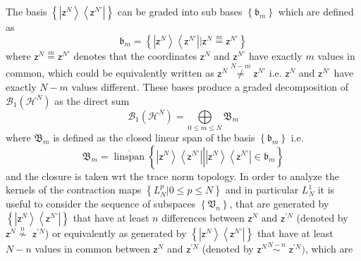 \documentclass[aps,preprint]{revtex4}%
\begin{document}
The basis $\left\{  \left\vert \mathsf{z}^{N}\right\rangle \left\langle
\mathsf{z}^{N\prime}\right\vert \right\}  $ can be graded into sub bases
$\left\{  \mathfrak{b}_{m}\right\}  $ which are defined as
\begin{equation}
\mathfrak{b}_{m}=\left\{  \left\vert \mathsf{z}^{N}\right\rangle \left\langle
\mathsf{z}^{N\prime}\right\vert |\mathsf{z}^{N}\overset{m}{=}\mathsf{z}%
^{N\prime}\right\}
\end{equation}
where $\mathsf{z}^{N}\overset{m}{=}\mathsf{z}^{N\prime}$ denotes that the
coordinates $\mathsf{z}^{N}$ and $\mathsf{z}^{N\prime}$ have exactly $m$
values in common, which could be equivalently written as $\mathsf{z}%
^{N}\overset{N-m}{\neq}\mathsf{z}^{N\prime}$ i.e. $\mathsf{z}^{N}$ and
$\mathsf{z}^{N\prime}$ have exactly $N-m$ values different. These bases
produce a graded decomposition of $\mathcal{B}_{1}\left(  \mathcal{H}%
^{N}\right)  $ as the direct sum
\begin{equation}
\mathcal{B}_{1}\left(  \mathcal{H}^{N}\right)  =%
{\displaystyle\bigoplus\limits_{0\leq m\leq N}}
\mathfrak{B}_{m}%
\end{equation}
where $\mathfrak{B}_{m}$ is defined as the closed linear span of the basis
$\left\{  \mathfrak{b}_{m}\right\}  $ i.e.
\begin{equation}
\mathfrak{B}_{m}=\overline{\operatorname{linspan}}\left\{  \left.  \underset
{}{\left\vert \mathsf{z}^{N}\right\rangle \left\langle \mathsf{z}^{N\prime
}\right\vert }\right\vert \left\vert \mathsf{z}^{N}\right\rangle \left\langle
\mathsf{z}^{N\prime}\right\vert \in\mathfrak{b}_{m}\right\}
\end{equation}
and the closure is taken wrt the trace norm topology. In order to analyze the
kernels of the contraction maps $\left\{  L_{N}^{p}|0\leq p\leq N\right\}  $
and in particular $L_{N}^{1}$ it is useful to consider the sequence of
subspaces $\left\{  \mathfrak{V}_{n}\right\}  $, that are generated by
$\left\{  \left\vert \mathsf{z}^{N}\right\rangle \left\langle \mathsf{z}%
^{N\prime}\right\vert \right\}  $ that have at least $n$ differences between
$\mathsf{z}^{N}$ and $\mathsf{z}^{\prime N}$ (denoted by $\mathsf{z}%
^{N}\overset{n}{\nsim}$ $\mathsf{z}^{\prime N}$) or equivalently as generated
by $\left\{  \left\vert \mathsf{z}^{N}\right\rangle \left\langle
\mathsf{z}^{N\prime}\right\vert \right\}  $ that have at least $N-n$ values in
common between $\mathsf{z}^{N}$ and $\mathsf{z}^{\prime N}$ (denoted by
$\mathsf{z}^{N}\overset{N-n}{\sim}$ $\mathsf{z}^{\prime N})$, which are
\end{document}
